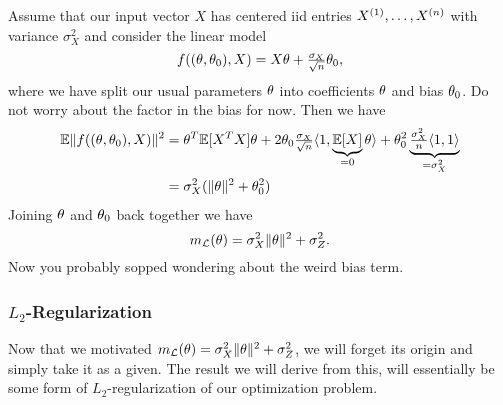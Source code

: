 Assume that our input vector \(X\) has centered iid entries \(X^{(1)},\dots,X^{(\dimension)}\)
with variance \(\sigma_X^2\) and consider the linear model
\begin{equation*}
	\model[(\param, \param_0)]{X} = X\param + \tfrac{\sigma_X}{\sqrt{\dimension}}\param_0,
\end{equation*}
where we have split our usual parameters \(\param\) into coefficients \(\param\) and
bias \(\param_0\). Do not worry about the factor in the bias for now. Then we have
\begin{align*}
	\E\|\model[(\param, \param_0)]{X}\|^2
	&= \param^T \E[X^T X] \param
	+ 2\param_0\tfrac{\sigma_X}{\sqrt{\dimension}} \langle 1, \underbrace{\E[X]}_{=0}\param\rangle
	+ \param_0^2\underbrace{\tfrac{\sigma_X^2}{\dimension}\langle 1, 1\rangle }_{=\sigma_X^2}\\
	&=\sigma_X^2 (\|\param\|^2 + \param_0^2)
\end{align*}
Joining \(\param\) and \(\param_0\) back together we have
\[
	m_\Loss(\param) = \sigma_X^2 \|\param\|^2 + \sigma_Z^2.
\]
Now you probably sopped wondering about the weird bias term.

\subsubsection{\texorpdfstring{\(L_2\)}{L₂}-Regularization}

Now that we motivated \(m_\Loss(\param) = \sigma_X^2\|\param\|^2 + \sigma_Z^2\), we
will forget its origin and simply take it as a given. The result we will derive
from this, will essentially be some form of \(L_2\)-regularization of our
optimization problem.


